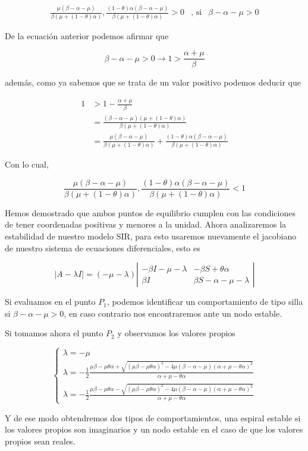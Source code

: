 $$\begin{array}{ccc}
\frac{\mu(\beta-\alpha-\mu)}{\beta(\mu+(1-\theta)\alpha)},\frac{(1-\theta)\alpha(\beta-\alpha-\mu)}{\beta(\mu+(1-\theta)\alpha)}>0 & \text{, si} & \beta-\alpha-\mu>0
\end{array}$$

De la ecuación anterior podemos afirmar que 

$$\beta-\alpha-\mu>0\longrightarrow1>\frac{\alpha+\mu}{\beta}$$

además, como ya sabemos que se trata de un valor positivo podemos deducir que 

\begin{align}
1&>1-\frac{\alpha+\mu}{\beta} \\
&= \frac{(\beta-\alpha-\mu)(\mu+(1-\theta)\alpha)}{\beta(\mu+(1-\theta)\alpha)}\\
&= \frac{\mu(\beta-\alpha-\mu)}{\beta(\mu+(1-\theta)\alpha)}+\frac{(1-\theta)\alpha(\beta-\alpha-\mu)}{\beta(\mu+(1-\theta)\alpha)}
\end{align}

Con lo cual,

$$\frac{\mu(\beta-\alpha-\mu)}{\beta(\mu+(1-\theta)\alpha)},\frac{(1-\theta)\alpha(\beta-\alpha-\mu)}{\beta(\mu+(1-\theta)\alpha)}<1$$

Hemos demostrado que ambos puntos de equilibrio cumplen con las condiciones de tener coordenadas positivas y menores a la unidad. Ahora analizaremos la estabilidad de nuestro modelo SIR, para esto usaremos nuevamente el jacobiano de nuestro sistema de ecuaciones diferenciales, esto es

$$|A-\lambda I|=(-\mu-\lambda)
\left|\begin{array}{cc}
-\beta I-\mu-\lambda & -\beta S+\theta\alpha\\
\beta I & \beta S-\alpha-\mu -\lambda
\end{array}\right|$$

Si evaluamos en el punto $P_1$, podemos identificar un comportamiento de tipo silla si $\beta-\alpha-\mu>0$, en caso contrario nos encontraremos ante un nodo estable.

Si tomamos ahora el punto $P_2$ y observamos los valores propios 

$$\left\{\begin{array}{l}
\lambda=-\mu\\
\lambda=-\frac{1}{2}\frac{\mu\beta-\mu\theta\alpha+\sqrt{(\mu\beta-\mu\theta\alpha)^2-4\mu(\beta-\alpha-\mu)(\alpha+\mu-\theta\alpha)^2}}{\alpha+\mu-\theta\alpha} \\
\lambda=-\frac{1}{2}\frac{\mu\beta-\mu\theta\alpha-\sqrt{(\mu\beta-\mu\theta\alpha)^2-4\mu(\beta-\alpha-\mu)(\alpha+\mu-\theta\alpha)^2}}{\alpha+\mu-\theta\alpha}
\end{array}\right.$$

Y de ese modo obtendremos dos tipos de comportamientos, una espiral estable si los valores propios son imaginarios y un nodo estable en el caso de que los valores propios sean reales.
\cite{mateModelsInPopulationAndEpidemiology}